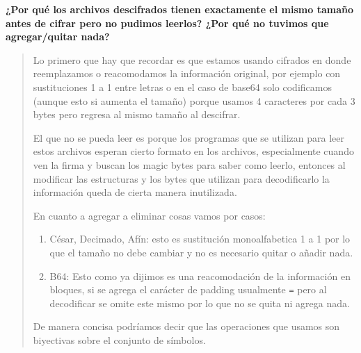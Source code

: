 \textbf{¿Por qué los archivos descifrados tienen exactamente el mismo tamaño antes de cifrar
pero no pudimos leerlos? ¿Por qué no tuvimos que agregar/quitar nada?}

\begin{quote}
    Lo primero que hay que recordar es que estamos usando cifrados en donde reemplazamos o
    reacomodamos la información original, por ejemplo con sustituciones 1 a 1 entre letras o en
    el caso de base64 solo codificamos (aunque esto si aumenta el tamaño) porque usamos 4
    caracteres por cada 3 bytes pero regresa al mismo tamaño al descifrar. \vspace{.3cm}

    El que no se pueda leer es porque los programas que se utilizan para leer estos archivos
    esperan cierto formato en los archivos, especialmente cuando ven la firma y buscan los magic
    bytes para saber como leerlo, entonces al modificar las estructuras y los bytes que
    utilizan para decodificarlo la información queda de cierta manera inutilizada.
    \vspace{.3cm}

    En cuanto a agregar a eliminar cosas vamos por casos:
    \begin{enumerate}
        \item César, Decimado, Afín: esto es sustitución monoalfabetica 1 a 1 por lo que el
            tamaño no debe cambiar y no es necesario quitar o añadir nada.
        \item B64: Esto como ya dijimos es una reacomodación de la información en bloques,
            si se agrega el carácter de padding usualmente \texttt{=} pero al decodificar
            se omite este mismo por lo que no se quita ni agrega nada.
    \end{enumerate}

    De manera concisa podríamos decir que las operaciones que usamos son biyectivas sobre el
    conjunto de símbolos. 
\end{quote}
\vspace{.5cm}
